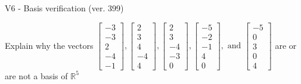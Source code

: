 \begin{exercise}
  \begin{exerciseTitle}V6 - Basis verification (ver. 399)\end{exerciseTitle}
  \begin{exerciseStatement}
    Explain why the vectors \(\left[\begin{array}{r}
-3 \\
-3 \\
2 \\
-4 \\
-1
\end{array}\right] , \left[\begin{array}{r}
2 \\
3 \\
4 \\
-4 \\
4
\end{array}\right] , \left[\begin{array}{r}
2 \\
3 \\
-4 \\
-3 \\
0
\end{array}\right] , \left[\begin{array}{r}
-5 \\
-2 \\
-1 \\
4 \\
0
\end{array}\right] , \text{ and } \left[\begin{array}{r}
-5 \\
0 \\
3 \\
0 \\
4
\end{array}\right]\) are or are not a basis of \(\mathbb{R}^5\)	



\end{exerciseStatement}
\end{exercise}
